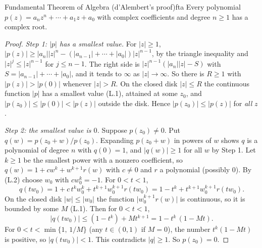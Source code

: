 \documentclass[11pt]{article}
\begin{document}
\begin{thm}{Fundamental Theorem of Algebra (d'Alembert's proof)}{fta}
Every polynomial $p(z)=a_nz^n+\cdots+a_1z+a_0$ with complex coefficients and degree $n\ge1$ has a complex root.
\end{thm}
\begin{proof}
\emph{Step 1: $\lvert p\rvert$ has a smallest value.} For $\lvert z\rvert\ge1$, $\lvert p(z)\rvert\ge\lvert a_n\rvert\lvert z\rvert^n-\left(\lvert a_{n-1}\rvert+\cdots+\lvert a_0\rvert\right)\lvert z\rvert^{n-1}$, by the triangle inequality and $\lvert z\rvert^j\le\lvert z\rvert^{n-1}$ for $j\le n-1$. The right side is $\lvert z\rvert^{n-1}\left(\lvert a_n\rvert\lvert z\rvert-S\right)$ with $S=\lvert a_{n-1}\rvert+\cdots+\lvert a_0\rvert$, and it tends to $\infty$ as $\lvert z\rvert\to\infty$. So there is $R\ge1$ with $\lvert p(z)\rvert>\lvert p(0)\rvert$ whenever $\lvert z\rvert>R$. On the closed disk $\lvert z\rvert\le R$ the continuous function $\lvert p\rvert$ has a smallest value (L.1), attained at some $z_0$, and $\lvert p(z_0)\rvert\le\lvert p(0)\rvert<\lvert p(z)\rvert$ outside the disk. Hence $\lvert p(z_0)\rvert\le\lvert p(z)\rvert$ for \emph{all} $z$.

\emph{Step 2: the smallest value is $0$.} Suppose $p(z_0)\ne0$. Put $q(w)=p(z_0+w)/p(z_0)$. Expanding $p(z_0+w)$ in powers of $w$ shows $q$ is a polynomial of degree $n$ with $q(0)=1$, and $\lvert q(w)\rvert\ge1$ for all $w$ by Step 1. Let $k\ge1$ be the smallest power with a nonzero coefficient, so $q(w)=1+cw^k+w^{k+1}r(w)$ with $c\ne0$ and $r$ a polynomial (possibly $0$). By (L.2) choose $w_0$ with $cw_0^k=-1$. For $0<t<1$,
\[
q(tw_0)=1+c\,t^kw_0^k+t^{k+1}w_0^{k+1}r(tw_0)=1-t^k+t^{k+1}w_0^{k+1}r(tw_0).
\]
On the closed disk $\lvert w\rvert\le\lvert w_0\rvert$ the function $\lvert w_0^{k+1}r(w)\rvert$ is continuous, so it is bounded by some $M$ (L.1). Then for $0<t<1$,
\[
\lvert q(tw_0)\rvert\le\left(1-t^k\right)+Mt^{k+1}=1-t^k\,(1-Mt).
\]
For $0<t<\min\{1,\,1/M\}$ (any $t\in(0,1)$ if $M=0$), the number $t^k(1-Mt)$ is positive, so $\lvert q(tw_0)\rvert<1$. This contradicts $\lvert q\rvert\ge1$. So $p(z_0)=0$.
\end{proof}
\end{document}

